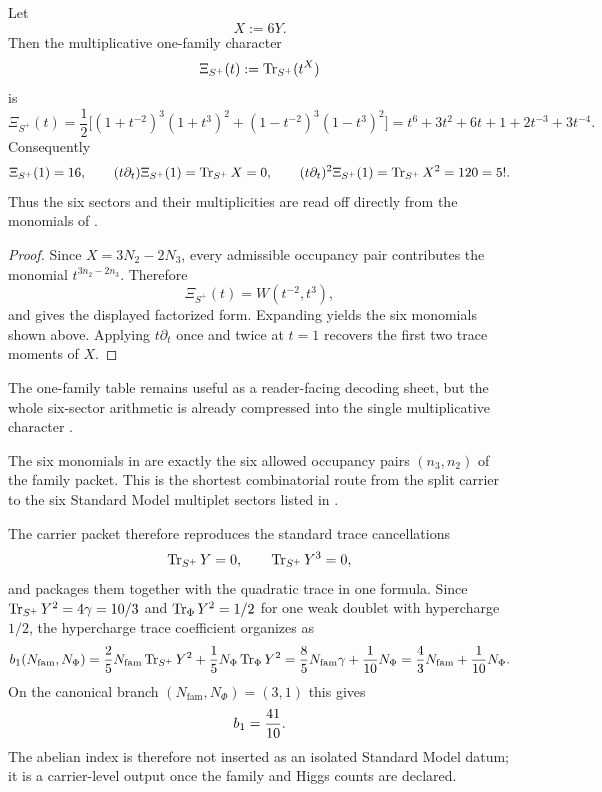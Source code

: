 \begin{corollary}
\label{cor:multiplicative-family-character}
Let
\[
X:=6Y.
\]
Then the multiplicative one-family character
\[
\Xi_{S^+}(t):=\operatorname{Tr}_{S^+}(t^X)
\]
is
\begin{equation}
\label{eq:multiplicative-family-character}
\Xi_{S^+}(t)
=
\frac12\Big[
(1+t^{-2})^3(1+t^3)^2
+
(1-t^{-2})^3(1-t^3)^2
\Big]
=
t^6+3t^2+6t+1+2t^{-3}+3t^{-4}.
\end{equation}
Consequently
\[
\Xi_{S^+}(1)=16,
\qquad
(t\partial_t)\Xi_{S^+}(1)=\operatorname{Tr}_{S^+}X=0,
\qquad
(t\partial_t)^2\Xi_{S^+}(1)=\operatorname{Tr}_{S^+}X^2=120=5!.
\]
Thus the six sectors and their multiplicities are read off directly from the monomials of
.
\end{corollary}

\begin{proof}
Since $X=3N_2-2N_3$, every admissible occupancy pair contributes the monomial
$t^{3n_2-2n_3}$. Therefore
\[
\Xi_{S^+}(t)=W(t^{-2},t^3),
\]
and  gives the displayed factorized form. Expanding yields the six
monomials shown above. Applying $t\partial_t$ once and twice at $t=1$ recovers the first two trace
moments of $X$.
\end{proof}

\begin{remark}
The one-family table remains useful as a reader-facing decoding sheet, but the whole six-sector
arithmetic is already compressed into the single multiplicative character
.
\end{remark}

\begin{remark}
The six monomials in  are exactly the six allowed occupancy pairs $(n_3,n_2)$ of the family packet. This is the shortest combinatorial route from the split carrier to the six Standard Model multiplet sectors listed in .
\end{remark}

The carrier packet therefore reproduces the standard trace cancellations
\[
\operatorname{Tr}_{S^+}Y=0,
\qquad
\operatorname{Tr}_{S^+}Y^3=0,
\]
and packages them together with the quadratic trace in one formula. Since $\operatorname{Tr}_{S^+}Y^2=4\gamma=10/3$ and $\operatorname{Tr}_\Phi Y^2=1/2$ for one weak doublet with hypercharge $1/2$, the hypercharge trace coefficient organizes as
\begin{equation}
\label{eq:abelian-index}
b_1(N_{\mathrm{fam}},N_\Phi)
=
\frac25N_{\mathrm{fam}}\operatorname{Tr}_{S^+}Y^2+\frac15N_\Phi\operatorname{Tr}_\Phi Y^2
=
\frac85N_{\mathrm{fam}}\gamma+\frac1{10}N_\Phi
=
\frac43N_{\mathrm{fam}}+\frac1{10}N_\Phi.
\end{equation}
On the canonical branch $(N_{\mathrm{fam}},N_\Phi)=(3,1)$ this gives
\[
b_1=\frac{41}{10}.
\]
The abelian index is therefore not inserted as an isolated Standard Model datum; it is a carrier-level output once the family and Higgs counts are declared.

